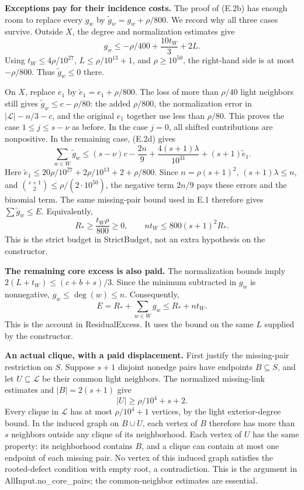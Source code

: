 \documentclass[english,11pt,a4paper]{article}
\newcounter{none}
\begin{document}
\textbf{Exceptions pay for their incidence costs.} The proof of (E.2b) has enough room to replace every \(g_w\) by \(\widetilde g_w=g_w+\rho/800\). We record why all three cases survive. Outside \(X\), the degree and normalization estimates give \[
g_w\le-\rho/400+\frac{10t_W}{3}+2L.
\] Using \(t_W\le4\rho/10^{27}\), \(L\le\rho/10^{13}+1\), and \(\rho\ge10^{50}\), the right-hand side is at most \(-\rho/800\). Thus \(\widetilde g_w\le0\) there.

On \(X\), replace \(e_1\) by \(\widetilde e_1=e_1+\rho/800\). The loss of more than \(\rho/40\) light neighbors still gives \(\widetilde g_w\le c-\rho/80\): the added \(\rho/800\), the normalization error in \(|\mathcal L|-n/3-c\), and the original \(e_1\) together use less than \(\rho/80\). This proves the case \(1\le j\le s-\nu\) as before. In the case \(j=0\), all shifted contributions are nonpositive. In the remaining case, (E.2d) gives \[
\sum_{w\in W}\widetilde g_w
\le(s-\nu)c-\frac{2n}{9}+
  \frac{4(s+1)\lambda}{10^{31}}+(s+1)\widetilde e_1.
\] Here \(\widetilde e_1\le20\rho/10^{27}+2\rho/10^{13}+2+\rho/800\). Since \(n=\rho(s+1)^2\), \((s+1)\lambda\le n\), and \(\binom{s+1}{2}\le\rho/(2\cdot10^{50})\), the negative term \(2n/9\) pays these errors and the binomial term. The same missing-pair bound used in E.1 therefore gives \(\sum\widetilde g_w\le E\). Equivalently, \[
R_*\ge\frac{t_W\rho}{800}\ge0,\qquad
nt_W\le800(s+1)^2R_*.
\tag{E.10}
\] This is the strict budget in StrictBudget, not an extra hypothesis on the constructor.

\textbf{The remaining core excess is also paid.} The normalization bounds imply \(2(L+t_W)\le(c+b+s)/3\). Since the minimum subtracted in \(g_w\) is nonnegative, \(g_w\le\deg(w)\le n\). Consequently, \[
E=R_*+\sum_{w\in W}g_w\le R_*+nt_W.
\tag{E.11}
\] This is the account in ResidualExcess. It uses the bound on the same \(L\) supplied by the constructor.

\textbf{An actual clique, with a paid displacement.} First justify the missing-pair restriction on \(S\). Suppose \(s+1\) disjoint nonedge pairs have endpoints \(B\subseteq S\), and let \(U\subseteq\mathcal L\) be their common light neighbors. The normalized missing-link estimates and \(|B|=2(s+1)\) give \[
|U|\ge\rho/10^4+s+2.
\] Every clique in \(\mathcal L\) has at most \(\rho/10^4+1\) vertices, by the light exterior-degree bound. In the induced graph on \(B\cup U\), each vertex of \(B\) therefore has more than \(s\) neighbors outside any clique of its neighborhood. Each vertex of \(U\) has the same property: its neighborhood contains \(B\), and a clique can contain at most one endpoint of each missing pair. No vertex of this induced graph satisfies the rooted-defect condition with empty root, a contradiction. This is the argument in {\ttfamily\small AllInput.\discretionary{\hbox{\ensuremath{\hookrightarrow}}}{}{}no\_\discretionary{\hbox{\ensuremath{\hookrightarrow}}}{}{}core\_\discretionary{\hbox{\ensuremath{\hookrightarrow}}}{}{}pairs}; the common-neighbor estimates are essential.
\end{document}
